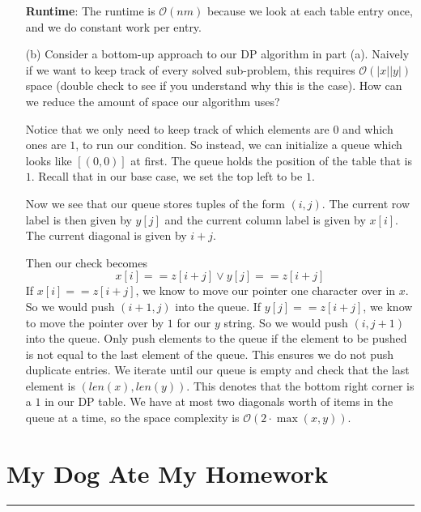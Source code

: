 \documentclass{article}
\begin{document}
\begin{itemize}
\begin{answer}
                \textbf{Runtime}: The runtime is $\mathcal{O}(nm)$ because we look at each table entry once, and we do constant work per entry.
            \end{answer}

        \item [(b)] Consider a bottom-up approach to our DP algorithm in part (a). Naively if we want to keep track of every solved sub-problem, this requires $\mathcal{O}(\lvert x \rvert\lvert y \rvert)$ space (double check to see if you understand why this is the case). How can we reduce the amount of space our algorithm uses?
            \begin{answer}
                Notice that we only need to keep track of which elements are $0$ and which ones are $1$, to run our condition. So instead, we can initialize a queue which looks like $[(0, 0)]$ at first. The queue holds the position of the table that is $1$. Recall that in our base case, we set the top left to be $1$. 

                Now we see that our queue stores tuples of the form $(i, j)$. The current row label is then given by $y[j]$ and the current column label is given by $x[i]$. The current diagonal is given by $i + j$.

                Then our check becomes
                    \begin{equation*}
                        x[i] == z[i + j] \lor y[j] == z[i + j]
                    \end{equation*}
                If $x[i] == z[i + j]$, we know to move our pointer one character over in $x$. So we would push $(i + 1, j)$ into the queue. If $y[j] == z[i + j]$, we know to move the pointer over by $1$ for our $y$ string. So we would push $(i, j + 1)$ into the queue. Only push elements to the queue if the element to be pushed is not equal to the last element of the queue. This ensures we do not push duplicate entries. We iterate until our queue is empty and check that the last element is $(len(x), len(y))$. This denotes that the bottom right corner is a $1$ in our DP table. We have at most two diagonals worth of items in the queue at a time, so the space complexity is $\mathcal{O}(2 \cdot \max(x, y))$.
            \end{answer}
    \end{itemize}

\newpage
\section*{My Dog Ate My Homework}
\hrule
\end{document}
